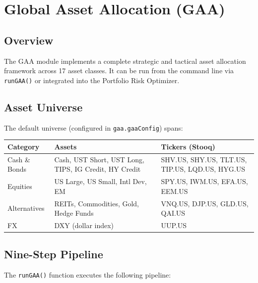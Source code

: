 \documentclass[11pt,a4paper]{article}
\begin{document}
\section{Global Asset Allocation (GAA)}

\subsection{Overview}
The GAA module implements a complete strategic and tactical asset allocation framework across 17 asset classes. It can be run from the command line via \texttt{runGAA()} or integrated into the Portfolio Risk Optimizer.

\subsection{Asset Universe}
The default universe (configured in \texttt{gaa.gaaConfig}) spans:
\begin{center}
\begin{tabularx}{\textwidth}{l l X}
\toprule
\textbf{Category} & \textbf{Assets} & \textbf{Tickers (Stooq)} \\
\midrule
Cash \& Bonds & Cash, UST Short, UST Long, TIPS, IG Credit, HY Credit & SHV.US, SHY.US, TLT.US, TIP.US, LQD.US, HYG.US \\
Equities & US Large, US Small, Intl Dev, EM & SPY.US, IWM.US, EFA.US, EEM.US \\
Alternatives & REITs, Commodities, Gold, Hedge Funds & VNQ.US, DJP.US, GLD.US, QAI.US \\
FX & DXY (dollar index) & UUP.US \\
\bottomrule
\end{tabularx}
\end{center}

\subsection{Nine-Step Pipeline}
The \texttt{runGAA()} function executes the following pipeline:
\end{document}
